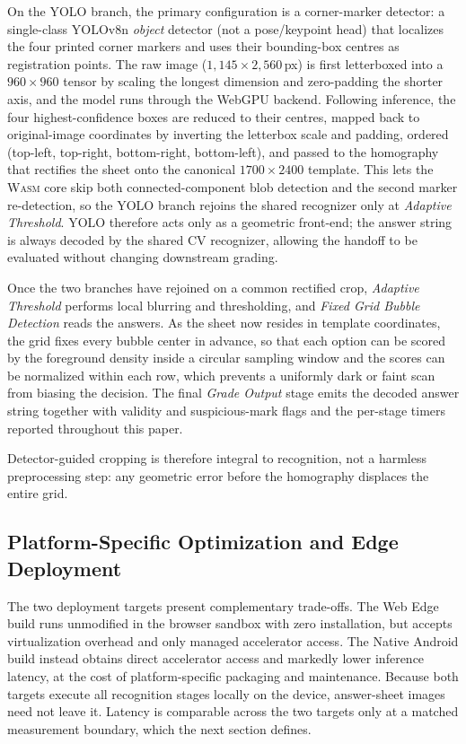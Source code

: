 \documentclass[conference]{IEEEtran}
\newcommand{\wasm}{\textnormal{\textsc{Wasm}}}
\begin{document}
On the YOLO branch, the primary configuration is a corner-marker
detector: a single-class YOLOv8n \emph{object} detector (not a pose/keypoint
head) that localizes the four printed corner markers and uses their
bounding-box centres as registration points. The raw image ($1{,}145\times2{,}560$\,px) is first letterboxed into a
$960\times960$ tensor by scaling the longest dimension and zero-padding the
shorter axis, and the model runs through the WebGPU backend. Following inference, the four highest-confidence boxes are reduced to their
centres, mapped back to original-image coordinates by inverting the letterbox
scale and padding, ordered (top-left, top-right, bottom-right, bottom-left), and
passed to the homography that rectifies the sheet onto the canonical
$1700\times2400$ template. This lets the \wasm{} core skip both connected-component
blob detection and the second marker re-detection, so the YOLO branch rejoins the
shared recognizer only at \emph{Adaptive Threshold}. YOLO therefore acts only as a geometric front-end; the answer string is always
decoded by the shared CV recognizer, allowing the handoff to be evaluated
without changing downstream grading.

Once the two branches have rejoined on a common rectified crop,
\emph{Adaptive Threshold} performs local blurring and thresholding, and
\emph{Fixed Grid Bubble Detection} reads the answers. As the sheet now
resides in template coordinates, the grid fixes every bubble center in
advance, so that each option can be scored by the foreground density
inside a circular sampling window and the scores can be normalized within
each row, which prevents a uniformly dark or faint scan from biasing the
decision. The final \emph{Grade Output} stage emits the decoded answer
string together with validity and suspicious-mark flags and the per-stage
timers reported throughout this paper.

Detector-guided cropping is therefore integral to recognition, not a harmless
preprocessing step: any geometric error before the homography displaces the
entire grid.

\subsection{Platform-Specific Optimization and Edge Deployment}
The two deployment targets present complementary trade-offs. The Web Edge
build runs unmodified in the browser sandbox with zero installation, but
accepts virtualization overhead and only managed accelerator access. The
Native Android build instead obtains direct accelerator access and markedly
lower inference latency, at the cost of platform-specific packaging and
maintenance. Because both targets execute all recognition stages locally on the device,
answer-sheet images need not leave it. Latency is comparable across the two
targets only at a matched measurement boundary, which the next section defines.
\end{document}
